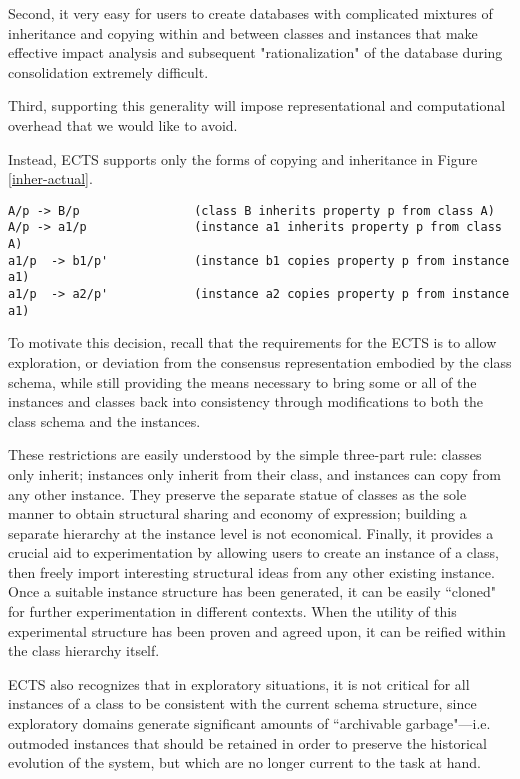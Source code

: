 Second, it very easy for users to create databases with complicated mixtures of
inheritance and copying within and between classes and instances that make 
effective impact analysis and subsequent "rationalization" of the database
during consolidation extremely difficult.   

Third, supporting this generality will impose representational and computational
overhead that we would like to avoid.

Instead, ECTS supports only the forms of copying and inheritance in Figure
\ref{inher-actual}.

\begin{figure*}
\figureline
\small\begin{verbatim}
A/p -> B/p                (class B inherits property p from class A)
A/p -> a1/p               (instance a1 inherits property p from class A)
a1/p  -> b1/p'            (instance b1 copies property p from instance a1)
a1/p  -> a2/p'            (instance a2 copies property p from instance a1)
\end{verbatim}\normalsize
\figureline
\caption{Actual inheritance relationships}
\label{inher-actual}
\end{figure*}

To motivate this decision, recall that the requirements for the ECTS is to allow
exploration, or deviation from the consensus representation embodied by the 
class schema, while still providing the means necessary to bring some or all of
the instances and classes back into consistency through modifications to both 
the class schema and the instances.

These restrictions are easily understood by the simple three-part rule: classes
only inherit; instances only inherit from their class, and instances can copy 
from any other instance.  They preserve the separate statue of classes as the 
sole manner to obtain structural sharing and economy of expression; building a 
separate hierarchy at the instance level is not economical.  Finally, it 
provides a crucial aid to experimentation by allowing users to create an 
instance of a class, then freely import interesting structural ideas from any 
other existing instance.  Once a suitable instance structure has been generated,
it can be easily ``cloned" for further experimentation in different contexts.  
When the utility of this experimental structure has been proven and agreed upon,
it can be reified within the class hierarchy itself.

ECTS also recognizes that in exploratory situations, it is not
critical for all instances of a class to be consistent with the
current schema structure, since exploratory domains generate
significant amounts of ``archivable garbage"---i.e. outmoded instances
that should be retained in order to preserve the historical evolution
of the system, but which are no longer current to the task at hand.

